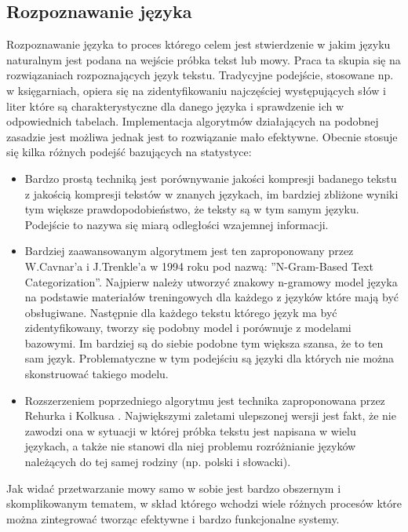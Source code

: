 \subsection{Rozpoznawanie języka}
Rozpoznawanie języka \cite{adamsresnik1997}  to proces którego celem jest stwierdzenie w jakim języku naturalnym jest podana na wejście próbka tekst lub mowy. Praca ta skupia się na rozwiązaniach rozpoznających język tekstu. Tradycyjne podejście, stosowane np. w księgarniach, opiera się na zidentyfikowaniu najczęściej występujących słów i liter które są charakterystyczne dla danego języka i sprawdzenie ich w odpowiednich tabelach. Implementacja algorytmów działających na podobnej zasadzie jest możliwa jednak jest to rozwiązanie mało efektywne. Obecnie stosuje się kilka różnych podejść bazujących na statystyce:
 \begin{itemize}
	\item Bardzo prostą techniką jest porównywanie jakości kompresji badanego tekstu z jakością kompresji tekstów w znanych językach, im bardziej zbliżone wyniki tym większe prawdopodobieństwo, że teksty są w tym samym języku. Podejście to nazywa się miarą odległości wzajemnej informacji.
	\item Bardziej zaawansowanym algorytmem jest ten zaproponowany przez W.Cavnar'a i J.Trenkle'a w 1994 roku pod nazwą: ''N-Gram-Based Text Categorization''. Najpierw należy utworzyć znakowy n-gramowy model języka na podstawie materiałów treningowych dla każdego z języków które mają być obsługiwane. Następnie dla każdego tekstu którego język ma być zidentyfikowany, tworzy się podobny model i porównuje z modelami bazowymi. Im bardziej są do siebie podobne tym większa szansa, że to ten sam język. Problematyczne w tym podejściu są języki dla których nie można skonstruować takiego modelu. 
	\item Rozszerzeniem poprzedniego algorytmu jest technika zaproponowana przez Rehurka i Kolkusa \cite{rehurek2009} . Największymi zaletami ulepszonej wersji jest fakt, że nie zawodzi ona w sytuacji w której próbka tekstu jest napisana w wielu językach, a także nie stanowi dla niej problemu rozróżnianie języków należących do tej samej rodziny (np. polski i słowacki). 
\end{itemize} 
Jak widać przetwarzanie mowy samo w sobie jest bardzo obszernym i skomplikowanym tematem, w skład którego wchodzi wiele różnych procesów które można zintegrować tworząc efektywne i bardzo funkcjonalne systemy.

